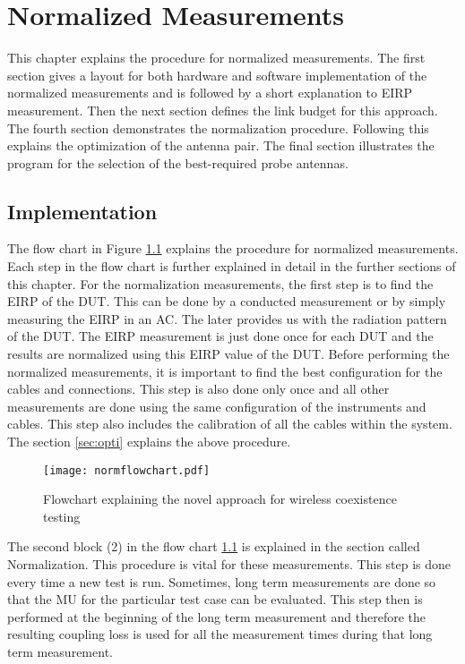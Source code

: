\chapter{Normalized Measurements}\label{chap:normalized}
This chapter explains the procedure for normalized measurements. The first section gives a layout for both hardware and software implementation of the normalized measurements and is followed by a short explanation to \acs{EIRP} measurement. Then the next section defines the link budget for this approach. The fourth section demonstrates the normalization procedure. Following this explains the optimization of the antenna pair. The final section illustrates the program for the selection of the best-required probe antennas.


\section{Implementation}
The flow chart in Figure \ref{fig:1} explains the procedure for normalized measurements. Each step in the flow chart is further explained in detail in the further sections of this chapter. For the normalization measurements, the first step is to find the \acs{EIRP} of the \acs{DUT}. This can be done by a conducted measurement or by simply measuring the \acs{EIRP} in an \acf{AC}. The later provides us with the radiation pattern of the \acs{DUT}.  The \acs{EIRP} measurement is just done once for each \acs{DUT} and the results are normalized using this \acs{EIRP} value of the \acs{DUT}. Before performing the normalized measurements, it is important to find the best configuration for the cables and connections. This step is also done only once and all other measurements are done using the same configuration of the instruments and cables. This step also includes the calibration of all the cables within the system.  The section \ref{sec:opti} explains the above procedure.

\begin{figure}[H]
\centering
\texttt{[image: normflowchart.pdf]}
\caption{Flowchart explaining the novel approach for wireless coexistence testing}
\label{fig:1} 
\end{figure}

The second block (2) in the flow chart \ref{fig:1} is explained in the section called Normalization. This procedure is vital for these measurements. This step is done every time a new test is run. Sometimes, long term measurements are done so that the \acf{MU} for the particular test case can be evaluated. This step then is performed at the beginning of the long term measurement and therefore the resulting coupling loss is used for all the measurement times during that long term measurement. \\
 
